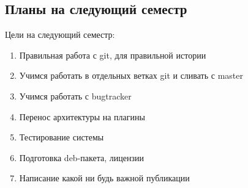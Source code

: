 \subsection{Планы на следующий семестр}

Цели на следующий семестр:

\begin{enumerate}
\item Правильная работа с git, для правильной истории 
\item Учимся работать в отдельных ветках git и сливать с master
\item Учимся работать с bugtracker 
\item Перенос архитектуры на плагины
\item Тестирование системы
\item Подготовка deb-пакета, лицензии
\item Написание какой ни будь важной публикации
\end{enumerate}